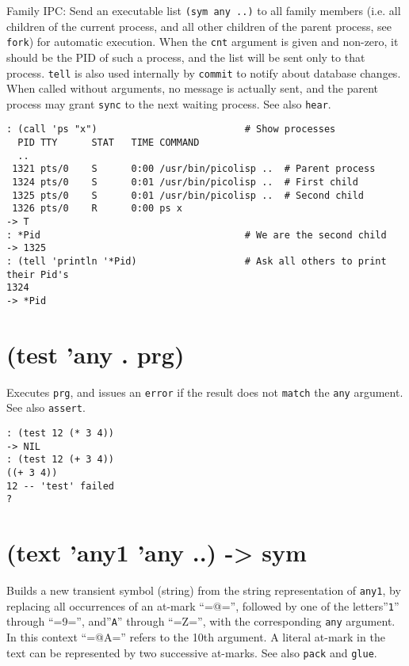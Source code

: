 {{{{{{{{Family IPC: Send an executable list \texttt{(sym any ..)} to all family members
(i.e. all children of the current process, and all other children of the
parent process, see \texttt{fork}) for automatic execution. When the \texttt{cnt}
argument is given and non-zero, it should be the PID of such a process,
and the list will be sent only to that process. \texttt{tell} is also used
internally by \texttt{commit} to notify about database changes. When called
without arguments, no message is actually sent, and the parent process
may grant \texttt{sync} to the next waiting process. See also \texttt{hear}.


\begin{verbatim}
: (call 'ps "x")                          # Show processes
  PID TTY      STAT   TIME COMMAND
  ..
 1321 pts/0    S      0:00 /usr/bin/picolisp ..  # Parent process
 1324 pts/0    S      0:01 /usr/bin/picolisp ..  # First child
 1325 pts/0    S      0:01 /usr/bin/picolisp ..  # Second child
 1326 pts/0    R      0:00 ps x
-> T
: *Pid                                    # We are the second child
-> 1325
: (tell 'println '*Pid)                   # Ask all others to print their Pid's
1324
-> *Pid
\end{verbatim}

 
\section{(test 'any . prg)}
\label{sec-8-1-20-12}


Executes \texttt{prg}, and issues an \texttt{error} if the result does not \texttt{match} the
\texttt{any} argument. See also \texttt{assert}.


\begin{verbatim}
: (test 12 (* 3 4))
-> NIL
: (test 12 (+ 3 4))
((+ 3 4))
12 -- 'test' failed
?
\end{verbatim}

 
\section{(text 'any1 'any ..) -> sym}
\label{sec-8-1-20-13}


Builds a new transient symbol (string) from the string representation of
\texttt{any1}, by replacing all occurrences of an at-mark ``=@='', followed by
one of the letters''\texttt{1}'' through ``=9='', and''\texttt{A}'' through ``=Z='', with the
corresponding \texttt{any} argument. In this context ``=@A='' refers to the 10th
argument. A literal at-mark in the text can be represented by two
successive at-marks. See also \texttt{pack} and \texttt{glue}.


}}}}}}}}
